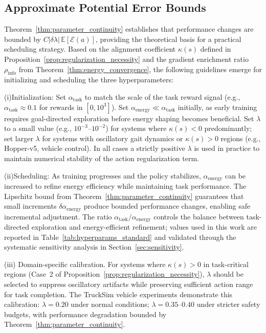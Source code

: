 \documentclass[journal]{IEEEtran}
\begin{document}
	\subsection{Approximate Potential Error Bounds}
	
	Theorem~\ref{thm:parameter_continuity} establishes that performance changes are bounded by $C|\delta\lambda|\,\mathbb{E}[\mathcal{E}(a)]$, providing the theoretical basis for a practical scheduling strategy. Based on the alignment coefficient $\kappa(s)$ defined in Proposition~\ref{prop:regularization_necessity} and the gradient enrichment ratio $\rho_{\text{info}}$ from Theorem~\ref{thm:energy_convergence}, the following guidelines emerge for initializing and scheduling the three hyperparameters:
	
	(i)Initialization: Set $\alpha_{\text{task}}$ to match the scale of the task reward signal (e.g., $\alpha_{\text{task}} \approx 0.1$ for rewards in $[0, 10^3]$). Set $\alpha_{\text{energy}} \ll \alpha_{\text{task}}$ initially, as early training requires goal-directed exploration before energy shaping becomes beneficial. Set $\lambda$ to a small value (e.g., $10^{-3}$--$10^{-2}$) for systems where $\kappa(s) < 0$ predominantly; set larger $\lambda$ for systems with oscillatory gait dynamics or $\kappa(s) > 0$ regions (e.g., Hopper-v5, vehicle control). In all cases a strictly positive $\lambda$ is used in practice to maintain numerical stability of the action regularization term.
	
	(ii)Scheduling: As training progresses and the policy stabilizes, $\alpha_{\text{energy}}$ can be increased to refine energy efficiency while maintaining task performance. The Lipschitz bound from Theorem~\ref{thm:parameter_continuity} guarantees that small increments $\delta\alpha_{\text{energy}}$ produce bounded performance changes, enabling safe incremental adjustment. The ratio $\alpha_{\text{task}} / \alpha_{\text{energy}}$ controls the balance between task-directed exploration and energy-efficient refinement; values used in this work are reported in Table~\ref{tab:hyperparams_standard} and validated through the systematic sensitivity analysis in Section~\ref{sec:sensitivity}.
	
	(iii) Domain-specific calibration. For systems where $\kappa(s) > 0$ in task-critical regions (Case~2 of Proposition~\ref{prop:regularization_necessity}), $\lambda$ should be selected to suppress oscillatory artifacts while preserving sufficient action range for task completion. The TruckSim vehicle experiments demonstrate this calibration: $\lambda = 0.20$ under normal conditions; $\lambda = 0.35$--$0.40$ under stricter safety budgets, with performance degradation bounded by Theorem~\ref{thm:parameter_continuity}.
	
\end{document}
